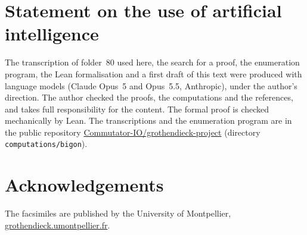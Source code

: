 \documentclass[11pt,a4paper]{amsart}
\theoremstyle{definition}
\theoremstyle{remark}
\begin{document}
\section*{Statement on the use of artificial intelligence}
The transcription of folder~80 used here, the search for a proof, the enumeration program, the Lean formalisation and a first draft of this text were produced with language models (Claude Opus~5 and Opus~5.5, Anthropic), under the author's direction. The author checked the proofs, the computations and the references, and takes full responsibility for the content. The formal proof is checked mechanically by Lean. The transcriptions and the enumeration program are in the public repository \href{https://github.com/Commutator-IO/grothendieck-project}{Commutator-IO/grothendieck-project} (directory \texttt{computations/bigon}).

\section*{Acknowledgements}
The facsimiles are published by the University of Montpellier, \href{https://grothendieck.umontpellier.fr/}{grothendieck.umontpellier.fr}.
\end{document}
